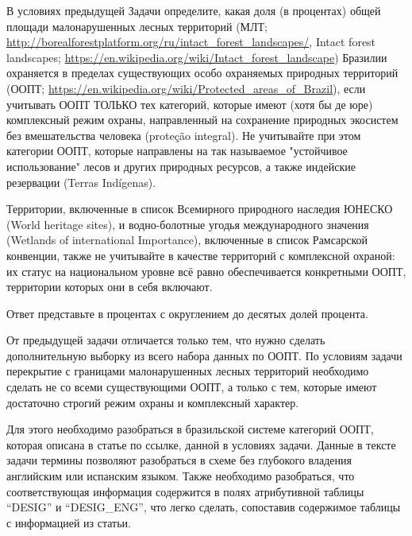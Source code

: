 
В условиях предыдущей Задачи определите, какая доля (в процентах) общей площади малонарушенных лесных территорий 
(МЛТ; \url{http://borealforestplatform.org/ru/intact_forest_landscapes/}, Intact forest landscapes; \url{https://en.wikipedia.org/wiki/Intact_forest_landscape}) 
Бразилии охраняется в пределах существующих особо охраняемых природных территорий (ООПТ; \url{https://en.wikipedia.org/wiki/Protected_areas_of_Brazil}), если учитывать ООПТ ТОЛЬКО тех категорий, которые имеют (хотя бы де юре) комплексный режим охраны, направленный на сохранение природных экосистем без вмешательства человека (proteção integral). Не учитывайте при этом категории ООПТ, которые направлены на так называемое "устойчивое использование" лесов и других природных ресурсов, а также индейские резервации (Terras Indígenas).

Территории, включенные в список Всемирного природного наследия ЮНЕСКО (World heritage sites), и водно-болотные угодья международного значения (Wetlands of international Importance), включенные в список Рамсарской конвенции, также не учитывайте в качестве территорий с комплексной охраной: их статус на национальном уровне всё равно обеспечивается конкретными ООПТ, территории которых они в себя включают.

Ответ представьте в процентах с округлением до десятых долей процента. 

\explanationSection

От предыдущей задачи отличается только тем, что нужно сделать дополнительную выборку из всего набора данных по ООПТ. По условиям задачи перекрытие с границами малонарушенных лесных территорий необходимо сделать не со всеми существующими ООПТ, а только с тем, которые имеют достаточно строгий режим охраны и комплексный характер.

Для этого необходимо разобраться в бразильской системе категорий ООПТ, которая описана в статье по ссылке, данной в условиях задачи. Данные в тексте задачи термины позволяют разобраться в схеме без глубокого владения английским или испанским языком. Также необходимо разобраться, что соответствующая информация содержится в полях атрибутивной таблицы “DESIG” и “DESIG\_ENG”, что легко сделать, сопоставив содержимое таблицы с информацией из статьи.

